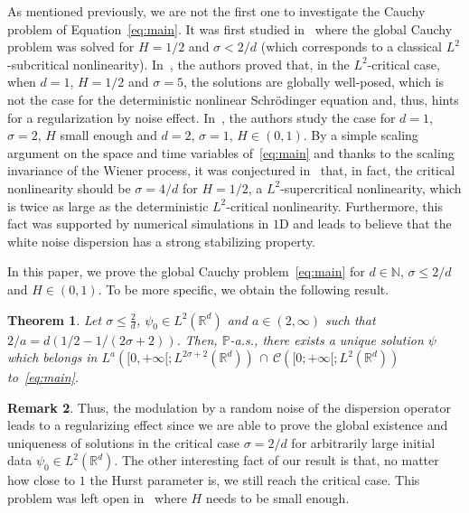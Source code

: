 \documentclass[10pt]{amsart}
\newtheorem{theo}{Theorem}[section]
\theoremstyle{definition}\newtheorem{defi}[theo]{Definition}\newtheorem{rema}[theo]{Remark}\newtheorem{exam}[theo]{Example}\newtheorem{exem}[theo]{Example}\newtheorem{nota}[theo]{Notation}
\newcommand{\bbP}{\mathbb{P}}
\newcommand{\bbR}{\mathbb{R}}
\newcommand{\bbN}{\mathbb{N}}
\newcommand{\clC}{\mathcal{C}}
\begin{document}
As mentioned previously, we are not the first one to investigate the Cauchy problem of Equation~\eqref{eq:main}. It was first studied in~\cite{de2010nonlinear} where the global Cauchy problem was solved for $H = 1/2$ and $\sigma < 2/d$ (which corresponds to a classical $L^2$-subcritical nonlinearity). In~\cite{debussche20111d}, the authors proved that, in the $L^2$-critical case, when $d = 1$, $H = 1/2$ and $\sigma = 5$, the solutions are globally well-posed, which is not the case for the deterministic nonlinear Schr\"odinger equation and, thus, hints for a regularization by noise effect. In~\cite{chouk2015nonlinear}, the authors study the case for $d=1$, $\sigma = 2$, $H$ small enough and $d=2$, $\sigma = 1$, $H\in(0,1)$. By a simple scaling argument on the space and time variables of~\eqref{eq:main} and thanks to the scaling invariance of the Wiener process, it was conjectured in~\cite{belaouar2015numerical} that, in fact, the critical nonlinearity should be $\sigma = 4/d$ for $H= 1/2$, a $L^2$-supercritical nonlinearity, which is twice as large as the deterministic $L^2$-critical nonlinearity. Furthermore, this fact was supported by numerical simulations in $1$D and leads to believe that the white noise dispersion has a strong stabilizing property.

In this paper, we prove the global Cauchy problem~\eqref{eq:main} for $d\in\bbN$, $\sigma\leq 2/d$ and $H\in(0,1)$. To be more specific, we obtain the following result.


\begin{theo}\label{thm:main}
Let $\sigma\leq \frac{2}{d}$, $\psi_0\in L^2(\bbR^d)$ and $a\in (2,\infty)$ such that $2/a = d\left(1/2-1/(2\sigma+2)\right)$. Then, $\bbP$-a.s., there exists a unique solution $\psi$ which belongs in $L^{a}([0,+\infty[;L^{2\sigma+2}(\bbR^d))\,\cap\, \clC([0;+\infty[;L^2(\bbR^d))$ to~\eqref{eq:main}.
\end{theo}


\begin{rema}
Thus, the modulation by a random noise of the dispersion operator leads to a regularizing effect since we are able to prove the global existence and uniqueness of solutions in the critical case $\sigma = 2/d$ for arbitrarily large initial data $\psi_0\in L^2(\bbR^d)$. The other interesting fact of our result is that, no matter how close to $1$ the Hurst parameter is, we still reach the critical case. This problem was left open in~\cite{chouk2015nonlinear} where $H$ needs to be small enough.
\end{rema}
\end{document}
